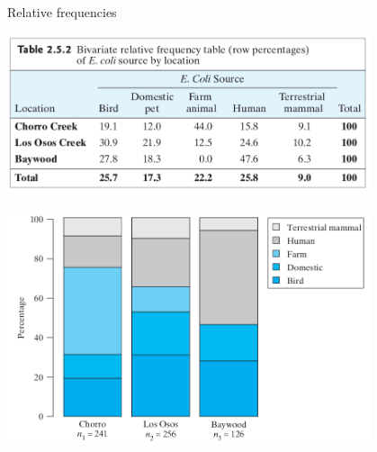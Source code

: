 \begin{frame}{Relative frequencies}
    \begin{center}
            \includegraphics[width=0.8\textwidth]{ecoli-freqs-tab2_5_2.png}

            \includegraphics[width=0.8\textwidth]{ecoli-freqs-fig2_5_2.png}
    \end{center}
\end{frame}


